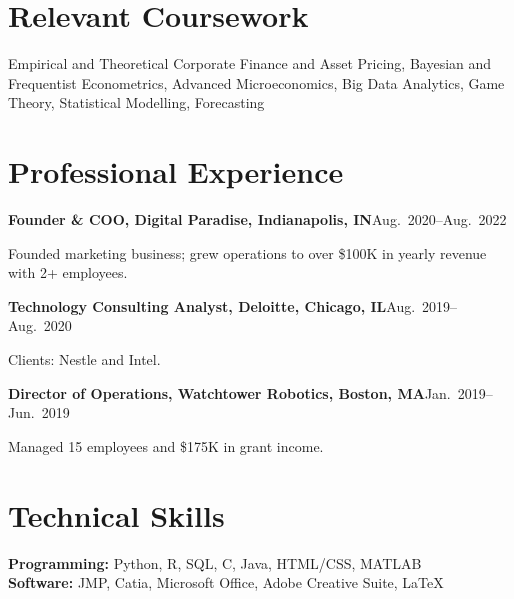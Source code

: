 \documentclass[11pt]{article}
\newcommand{\entry}[2]{\noindent\textbf{#1}\hfill #2\par}
\begin{document}
\section{Relevant Coursework}
Empirical and Theoretical Corporate Finance and Asset Pricing, Bayesian and Frequentist Econometrics, Advanced Microeconomics, Big Data Analytics, Game Theory, Statistical Modelling, Forecasting

\section{Professional Experience}
\entry{Founder \& COO, Digital Paradise, Indianapolis, IN}{Aug.\ 2020--Aug.\ 2022}
Founded marketing business; grew operations to over \$100K in yearly revenue with 2+ employees.

\entry{Technology Consulting Analyst, Deloitte, Chicago, IL}{Aug.\ 2019--Aug.\ 2020}
Clients: Nestle and Intel.

\entry{Director of Operations, Watchtower Robotics, Boston, MA}{Jan.\ 2019--Jun.\ 2019}
Managed 15 employees and \$175K in grant income.

\section{Technical Skills}
\textbf{Programming:} Python, R, SQL, C, Java, HTML/CSS, MATLAB\\
\textbf{Software:} JMP, Catia, Microsoft Office, Adobe Creative Suite, \LaTeX
\end{document}
